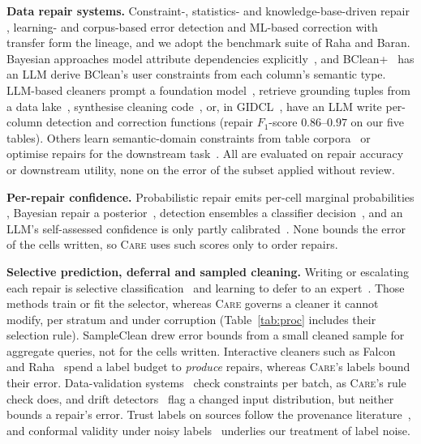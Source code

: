 \documentclass[sigconf, nonacm, balance=false]{acmart}
\theoremstyle{remark}
\begin{document}
\textbf{Data repair systems.} Constraint-, statistics- and knowledge-base-driven repair
\cite{10.14778/3137628.3137631, 10.1145/2463676.2463706, 10.1145/2723372.2749431, 10.1145/2723372.2747646, 10.14778/3476249.3476301, 10.1109/icde.2007.367920}, learning- and corpus-based error detection
\cite{10.1145/3299869.3324956, 10.1145/3299869.3319888, 10.1145/3183713.3196889} and ML-based correction with transfer
\cite{10.14778/3407790.3407801} form the lineage, and we adopt the benchmark suite of
Raha and Baran. Bayesian approaches model attribute dependencies
explicitly~\cite{10597910, pmlr-v130-lew21a}, and BClean+~\cite{11361168} has an LLM
derive BClean's user constraints from each column's semantic type. LLM-based cleaners
prompt a foundation model~\cite{10.14778/3574245.3574258}, retrieve grounding tuples
from a data lake~\cite{10.14778/3685800.3685890}, synthesise cleaning
code~\cite{11107465}, or, in GIDCL~\cite{10.1145/3698811}, have an LLM write per-column
detection and correction functions (repair $F_1$-score $0.86$--$0.97$ on our five
tables). Others learn semantic-domain constraints from table
corpora~\cite{10.1145/3725396} or optimise repairs for the downstream
task~\cite{10.1109/icde65706.2026.00198}. All are evaluated on repair accuracy or
downstream utility, none on the error of the subset applied without review.

\textbf{Per-repair confidence.} Probabilistic repair emits per-cell marginal
probabilities \cite{10.14778/3137628.3137631}, Bayesian repair a
posterior~\cite{10597910}, detection ensembles a classifier
decision~\cite{10.1145/3299869.3324956}, and an LLM's self-assessed confidence is only
partly calibrated~\cite{kadavath2022know, xiong2024llms}. None bounds the error of the
cells written, so \textsc{Care} uses such scores only to order repairs.

\textbf{Selective prediction, deferral and sampled cleaning.} Writing or escalating each
repair is selective classification~\cite{geifman2017selective} and learning to defer to
an expert~\cite{mozannar2020defer}. Those methods train or fit the selector, whereas
\textsc{Care} governs a cleaner it cannot modify, per stratum and under corruption
(Table~\ref{tab:proc} includes their selection rule). SampleClean
\cite{wang2014sampleclean} drew error bounds from a small cleaned sample for aggregate
queries, not for the cells written. Interactive cleaners such as
Falcon~\cite{he2016falcon} and Raha~\cite{10.1145/3299869.3324956} spend a label
budget to \emph{produce} repairs, whereas \textsc{Care}'s labels bound their error.
Data-validation systems~\cite{schelter2018deequ, breck2019tfdv, song2021autovalidate}
check constraints per batch, as \textsc{Care}'s rule check does, and drift detectors~\cite{rabanser2019drift}
flag a changed input distribution, but neither bounds a repair's error. Trust labels on sources follow the provenance
literature~\cite{cheney2009provenance}, and conformal validity under noisy
labels~\cite{einbinder2022noisy} underlies our treatment of label noise.
\end{document}
